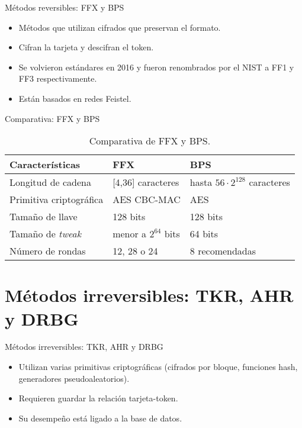 \documentclass{beamer}
\begin{document}
  \begin{frame}{Métodos reversibles: FFX y BPS}

    \begin{itemize}
      \item Métodos que utilizan cifrados que preservan el formato.
      \item Cifran la tarjeta y descifran el token.
      \item Se volvieron estándares en 2016 y fueron renombrados por el NIST
        a FF1 y FF3 respectivamente.
      \item Están basados en redes Feistel.
    \end{itemize}

  \end{frame}

  \begin{frame}{Comparativa: FFX y BPS}

    \begin{table}
      \begin{tabular}{|m{}|m{}|m{}|}
        \hline
        \textbf{Características} & \textbf{FFX} & \textbf{BPS}
        \\\hline
        Longitud de cadena & [4,36] caracteres & hasta $56 \cdot 2^{128}$ caracteres
        \\\hline
        Primitiva criptográfica & AES CBC-MAC & AES
        \\\hline
        Tamaño de llave & 128 bits & 128 bits
        \\\hline
        Tamaño de \textit{tweak} & menor a $2^{64}$ bits & 64 bits
        \\\hline
        Número de rondas & 12, 28 o 24 & 8 recomendadas
        \\\hline
      \end{tabular}
      \caption{Comparativa de FFX y BPS.}
    \end{table}

  \end{frame}

  \section{Métodos irreversibles: TKR, AHR y DRBG}

  \begin{frame}{Métodos irreversibles: TKR, AHR y DRBG}
    \begin{itemize}
      \item Utilizan varias primitivas criptográficas (cifrados por bloque,
        funciones hash, generadores pseudoaleatorios).
      \item Requieren guardar la relación tarjeta-token.
      \item Su desempeño está ligado a la base de datos.
    \end{itemize}
  \end{frame}
\end{document}
